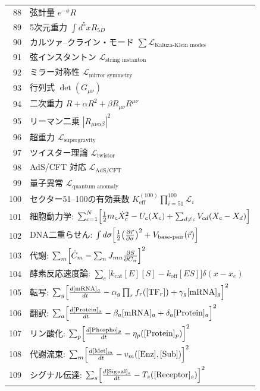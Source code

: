 \documentclass[13pt,a4paper]{ltjsarticle}
\begin{document}
\begin{longtable}{r l}
		88 & 弦計量 \(e^{-\phi}R\) \\
		89 & 5次元重力 \(\int d^5x R_{5D}\) \\
		90 & カルツァ–クライン・モード \(\sum\mathcal{L}_{\text{Kaluza‑Klein modes}}\) \\
		91 & 弦インスタントン \(\mathcal{L}_{\text{string instanton}}\) \\
		92 & ミラー対称性 \(\mathcal{L}_{\text{mirror symmetry}}\) \\
		93 & 行列式 \(\det(G_{\mu\nu})\) \\
		94 & 二次重力 \(R + \alpha R^2 + \beta R_{\mu\nu}R^{\mu\nu}\) \\
		95 & リーマン二乗 \(|R_{\mu\nu\alpha\beta}|^2\) \\
		96 & 超重力 \(\mathcal{L}_{\text{supergravity}}\) \\
		97 & ツイスター理論 \(\mathcal{L}_{\text{twistor}}\) \\
		98 & AdS/CFT 対応 \(\mathcal{L}_{\text{AdS/CFT}}\) \\
		99 & 量子異常 \(\mathcal{L}_{\text{quantum anomaly}}\) \\
		100 & セクター51–100の有効乗数 \(K^{(100)}_{\mathrm{eff}}\prod_{i=51}^{100}\mathcal{L}_i\) \\
		        101 & 細胞動力学: $\sum_{c=1}^{N}\Bigl[\frac12 m_c\dot X_c^2 - U_c(X_c) + \sum_{d\neq c}V_{cd}(X_c-X_d)\Bigr]$ \\
		102 & DNA二重らせん: $\int d\sigma\Bigl[\frac12\bigl(\frac{\partial\vec r}{\partial\sigma}\bigr)^2 + V_{\text{base-pair}}(\vec r)\Bigr]$ \\
		103 & 代謝: $\sum_m\Bigl[\dot C_m - \sum_n J_{mn}\frac{\partial S}{\partial C_n}\Bigr]^2$ \\
		104 & 酵素反応速度論: $\sum_e\bigl[k_{\text{cat}}[E][S] - k_{\text{off}}[ES]\bigr]\delta(x-x_e)$ \\
		105 & 転写: $\sum_g\Bigl[\frac{d[\text{mRNA}]_g}{dt} - \alpha_g\prod_r f_r([\text{TF}_r]) + \gamma_g[\text{mRNA}]_g\Bigr]^2$ \\
		106 & 翻訳: $\sum_a\Bigl[\frac{d[\text{Protein}]_a}{dt} - \beta_a[\text{mRNA}]_a + \delta_a[\text{Protein}]_a\Bigr]^2$ \\
		107 & リン酸化: $\sum_p\Bigl[\frac{d[\text{Phospho}]_p}{dt} - \eta_p([\text{Protein}]_p)\Bigr]^2$ \\
		108 & 代謝流束: $\sum_m\Bigl[\frac{d[\text{Met}]_m}{dt} - v_m([\text{Enz}],[\text{Sub}])\Bigr]^2$ \\
		109 & シグナル伝達: $\sum_s\Bigl[\frac{d[\text{Signal}]_s}{dt} - T_s([\text{Receptor}]_s)\Bigr]^2$ \\

\end{longtable}
\end{document}
